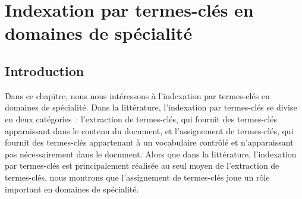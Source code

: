 \chapter{Indexation par termes-clés en domaines de spécialité}
\label{chap:main-domain_specific_keyphrase_annotation}


  \section{Introduction}
  \label{sec:main:domain_specific_keyphrase_annotation-introduction}
    Dans ce chapitre, nous nous intéressons à l'indexation par
    termes-clés en domaines de spécialité. Dans la littérature, l'indexation
    par termes-clés se divise en deux catégories~: l'extraction de termes-clés,
    qui fournit des termes-clés apparaissant dans le contenu du document, et
    l'assignement de termes-clés, qui fournit des termes-clés appartenant à un
    vocabulaire contrôlé et n'apparaissant pas nécessairement dans le document.
    Alors que dans la littérature, l'indexation par termes-clés est
    principalement réalisée au seul moyen de l'extraction de termes-clés, nous
    montrons que l'assignement de termes-clés joue un rôle important en domaines
    de spécialité.

